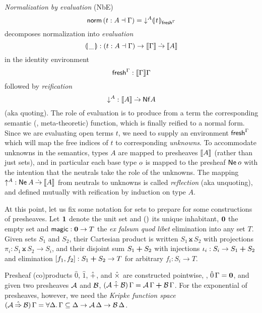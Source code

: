 \documentclass[sigplan,screen,fleqn,review]{acmart} %
\begin{document}
%
\emph{Normalization by evaluation} (NbE)
\[
  \mathsf{norm}\, (t : A \dashv \Gamma)
  = \mathord{\downarrow_{}^{A}} \llparenthesis\kern0.3ext\kern0.3ex\rrparenthesis_{\mathsf{fresh}^{\Gamma}}
\]
decomposes normalization into
\emph{evaluation}
\[%
\denty\_ : (t : A \from \Gamma) \to \den \Gamma \todot
  \den A
\]%
in the identity environment
\[%
\idenv\Gamma : \den \Gamma \Gamma
\]%
followed by
\emph{reification}
\[%
\down A : \den A \todot \tNf A
\]%
(aka quoting).
The role of evaluation is to produce from a term the corresponding
semantic (\ie, meta-theoretic) function, which is finally reified to a normal form.
Since we are evaluating open terms $t$, we need to supply an environment
$\mathsf{fresh}^{\Gamma}$ which will map the free indices of $t$ to corresponding
\emph{unknowns}.  To accommodate unknowns in the semantics, types $A$
are mapped to presheaves $\mathopen{{[\kern-0.14em[}} A \mathclose{{]\kern-0.14em]}}$ (rather than just sets), and in
particular each base type $o$ is mapped to the presheaf
$\mathsf{Ne}^{}\,o$ with the intention that the neutrals take the role of
the unknowns.  The mapping $\mathord{\uparrow_{}^{A}} : \mathsf{Ne}^{}\,A \mathbin{\dot{\to}} \mathopen{{[\kern-0.14em[}} A \mathclose{{]\kern-0.14em]}}$ from
neutrals to unknowns is called \emph{reflection} (aka unquoting), and defined mutually
with reification by induction on type $A$.

At this point, let us fix some notation for sets to prepare for some
constructions of presheaves.  Let $\mbox{\textbf{1}}$ denote the unit set and
$()$ its unique inhabitant, $\mbox{\textbf{0}}$ the empty set and
$\mathsf{magic} : \mbox{\textbf{0}} \to T$ the \emph{ex falsum quod libet} elimination
into any set $T$.  Given sets $S_1$ and $S_2$, their Cartesian product
is written $S_1 \btimes S_2$ with projections $\pi_i : S_1 \btimes S_2
\to S_i$, and their disjoint sum $S_1 \boldsymbol{+} S_2$ with injections
$\iota_i : S_i \to S_1 \boldsymbol{+} S_2$ and elimination $[f_1,f_2] : S_1 \boldsymbol{+}
S_2 \to T$ for arbitrary $f_i : S_i \to T$.

Presheaf (co)products $\hat0$, $\hat1$, $\mathbin{\hat+}$, and $\mathbin{\hat\times}$ are
constructed pointwise, \eg, $\hat0\,\Gamma = \mbox{\textbf{0}}$, and given two
presheaves $\mathcal{A}$ and $\mathcal{B}$,
$(\mathcal{A} \mathbin{\hat+} \mathcal{B})\,\Gamma = \mathcal{A}\,\Gamma \boldsymbol{+} \mathcal{B}\,\Gamma$.  For the
exponential of presheaves, however, we need the \emph{Kripke function
  space}
$(\A \hatto \B)\,\Gamma = \forall \Delta.\, \Gamma \sublist \Delta
\to \A\,\Delta \to \B\,\Delta$.
\end{document}
